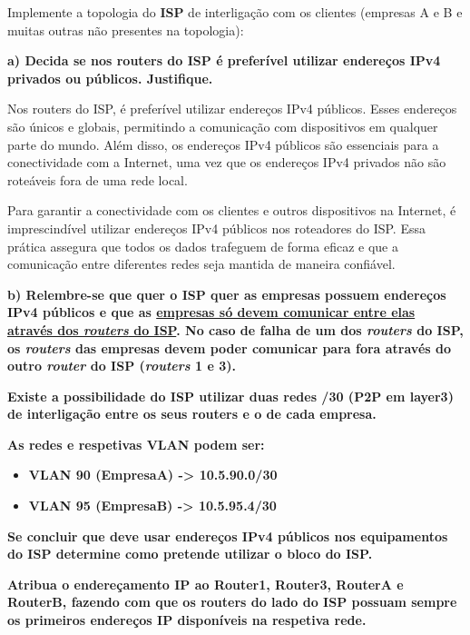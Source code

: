 \documentclass[11pt,english, openright, oneside]{book}
\begin{document}
Implemente a topologia do \textbf{ISP} de interligação com os clientes (empresas
A e B e muitas outras não presentes na topologia):   
\vspace{0.8cm}

\textbf{a) Decida se nos routers do ISP é preferível utilizar endereços IPv4 privados ou públicos. Justifique.}
\vspace{0.2cm}

Nos routers do ISP, é preferível utilizar endereços IPv4 públicos. Esses
endereços são únicos e globais, permitindo a comunicação com dispositivos em
qualquer parte do mundo. Além disso, os endereços IPv4 públicos são essenciais
para a conectividade com a Internet, uma vez que os endereços IPv4 privados não
são roteáveis fora de uma rede local.

Para garantir a conectividade com os clientes e outros dispositivos na Internet,
é imprescindível utilizar endereços IPv4 públicos nos roteadores do ISP. Essa
prática assegura que todos os dados trafeguem de forma eficaz e que a
comunicação entre diferentes redes seja mantida de maneira confiável.
\vspace{0.8cm}

\textbf{b) Relembre-se que quer o ISP quer as empresas possuem endereços IPv4
públicos e que as \underline{empresas só devem comunicar entre elas através dos
\textit{routers} do ISP}. No caso de falha de um dos \textit{routers} do ISP, os
\textit{routers} das empresas devem poder comunicar para fora através do outro
\textit{router} do ISP (\textit{routers} 1 e 3).}

\textbf{Existe a possibilidade do ISP utilizar duas redes /30 (P2P em layer3) de interligação entre os seus routers e o de cada empresa.}

\textbf{As redes e respetivas VLAN podem ser: }
\begin{itemize}
    \item \textbf{VLAN 90 (EmpresaA) -> 10.5.90.0/30 }
    \item \textbf{VLAN 95 (EmpresaB) -> 10.5.95.4/30 }
\end{itemize}

\textbf{Se concluir que deve usar endereços IPv4 públicos nos equipamentos do ISP determine como pretende utilizar o bloco do ISP.}

\textbf{Atribua o endereçamento IP ao Router1, Router3, RouterA e RouterB, fazendo com que os routers do lado do ISP possuam sempre os primeiros endereços IP disponíveis na respetiva rede.}
\vspace{0.2cm}
\end{document}
